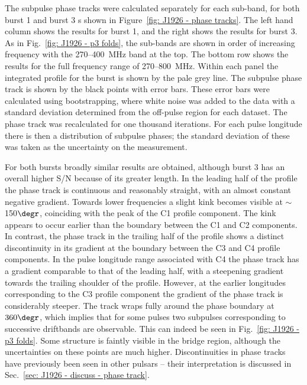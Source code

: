 The subpulse phase tracks were calculated separately for each sub-band, for both burst 1 and burst 3 s shown in Figure~\ref{fig: J1926 - phase tracks}. The left hand column shows the results for burst 1, and the right shows the results for burst 3. As in Fig.~\ref{fig: J1926 - p3 folds}, the sub-bands are shown in order of increasing frequency with the 270--400~MHz band at the top. The bottom row shows the results for the full frequency range of 270--800~MHz. Within each panel the integrated profile for the burst is shown by the pale grey line. The subpulse phase track is shown by the black points with error bars. These error bars were calculated using bootstrapping, where white noise was added to the data with a standard deviation determined from the off-pulse region for each dataset. The phase track was recalculated for one thousand iterations. For each pulse longitude there is then a distribution of subpulse phases; the standard deviation of these was taken as the uncertainty on the measurement.

For both bursts broadly similar results are obtained, although burst 3 has an overall higher S/N because of its greater length. In the leading half of the profile the phase track is continuous and reasonably straight, with an almost constant negative gradient. Towards lower frequencies a slight kink becomes visible at $\sim$150$\degr$, coinciding with the peak of the C1 profile component. The kink appears to occur earlier than the boundary between the C1 and C2 components. In contrast, the phase track in the trailing half of the profile shows a distinct discontinuity in its gradient at the boundary between the C3 and C4 profile components. In the pulse longitude range associated with C4 the phase track has a gradient comparable to that of the leading half, with a steepening gradient towards the trailing shoulder of the profile. However, at the earlier longitudes corresponding to the C3 profile component the gradient of the phase track is considerably steeper. The track wraps fully around the phase boundary at $360\degr$, which implies that for some pulses two subpulses corresponding to successive driftbands are observable. This can indeed be seen in Fig.~\ref{fig: J1926 - p3 folds}.  Some structure is faintly visible in the bridge region, although the uncertainties on these points are much higher. Discontinuities in phase tracks have previously been seen in other pulsars -- their interpretation is discussed in Sec.~\ref{sec: J1926 - discuss - phase track}.
















